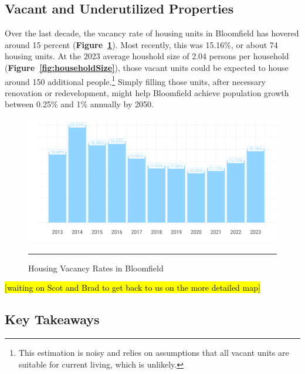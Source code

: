 \pagebreak
\subsection{Vacant and Underutilized Properties}

\noindent Over the last decade, the vacancy rate of housing units in Bloomfield has hovered around 15 percent (\textbf{Figure~\ref{fig:acsVacancy}}). Most recently, this was 15.16\%, or about 74 housing units. At the 2023 average houshold size of 2.04 persons per household (\textbf{Figure~\ref{fig:householdSize}}), those vacant units could be expected to house around 150 additional people.\footnote{This estimation is noisy and relies on assumptions that all vacant units are suitable for current living, which is unlikely.} Simply filling those units, after necessary renovation or redevelopment, might help Bloomfield achieve population growth between 0.25\% and 1\% annually by 2050.

\begin{figure}[H]
\centering
\begin{framed}
    \caption{Housing Vacancy Rates in Bloomfield}
    \label{fig:acsVacancy}
    \includegraphics[width=\linewidth]{figures/acs_vacancy.png}
    \rule[-5pt]{\linewidth}{0.4pt}
\end{framed}
\end{figure}

\pagebreak
\noindent \hl{[waiting on Scot and Brad to get back to us on the more detailed map]}

\pagebreak
\subsection*{Key Takeaways}

